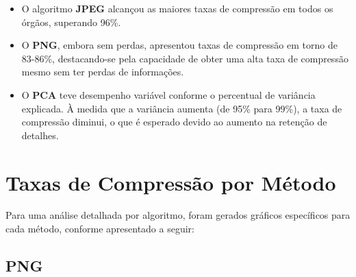 \begin{itemize}
    \item O algoritmo \textbf{\acrshort{JPEG}} alcançou as maiores taxas de compressão em todos os órgãos, superando 96\%.
    \item O \textbf{\acrshort{PNG}}, embora sem perdas, apresentou taxas de compressão em torno de 83-86\%, destacando-se pela capacidade de obter uma alta taxa de compressão mesmo sem ter perdas de informações.
    \item O \textbf{\acrshort{PCA}} teve desempenho variável conforme o percentual de variância explicada. À medida que a variância aumenta (de 95\% para 99\%), a taxa de compressão diminui, o que é esperado devido ao aumento na retenção de detalhes.
\end{itemize}

\begin{figure}[!htbp]
	\centering
\end{figure}

\section{Taxas de Compressão por Método}

Para uma análise detalhada por algoritmo, foram gerados gráficos específicos para cada método, conforme apresentado a seguir:

\subsection{\acrshort{PNG}}


